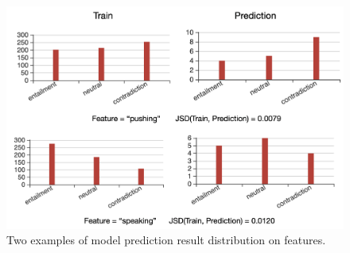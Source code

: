 
\begin{figure}[th]
\centering
\includegraphics[width=1.0\columnwidth]{picture/model_result.jpg}
\caption{Two examples of model prediction result distribution on features.}
\label{fig:model_result}
\end{figure}


